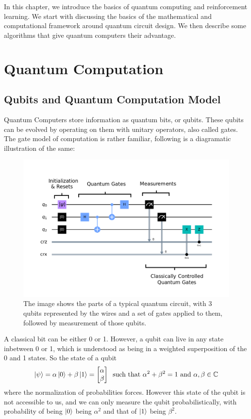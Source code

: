 In this chapter, we introduce the basics of quantum computing and reinforcement learning. We start with discussing the basics of the mathematical and computational framework around quantum circuit design. We then describe some algorithms that give quantum computers their advantage.


\section{Quantum Computation}


\subsection{Qubits and Quantum Computation Model}

Quantum Computers store information as quantum bits, or qubits. These qubits can be evolved by operating on them with unitary operators, also called gates. The gate model of computation is rather familiar, following is a diagramatic illustration of the same:

\begin{figure}[ht]
    \centering
    \includegraphics[width=0.8\linewidth]{figures/quantum/quantum_circuit_example.png}
    \caption{The image shows the parts of a typical quantum circuit, with 3 qubits represented by the wires and a set of gates applied to them, followed by measurement of those qubits.}
    \label{fig:quantum-circuit-example}
\end{figure}


A classical bit can be either 0 or 1. However, a qubit can live in any state inbetween 0 or 1, which is understood as being in a weighted superposition of the 0 and 1 states. So the state of a qubit 
\begin{equation}
    \ket{\psi} = \alpha \ket{0} + \beta \ket{1} = \begin{bmatrix}\alpha \\ \beta\end{bmatrix} \;\;\text{such that }\alpha^2 + \beta^2 = 1 \text{ and } \alpha, \beta \in \mathbb{C}
\end{equation}
where the normalization of probabilities forces. However this state of the qubit is not accessible to us, and we can only measure the qubit probabilistically, with probability of being $\ket{0}$ being $\alpha^2$ and that of $\ket{1}$ being $\beta^2$.

